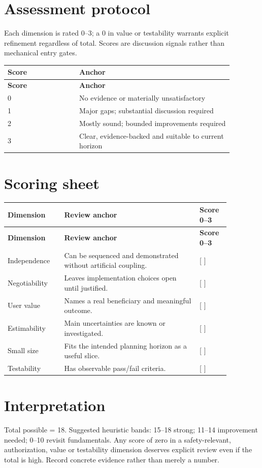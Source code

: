 \documentclass[11pt,letterpaper]{article}
\begin{document}
\section{Assessment protocol}
Each dimension is rated 0–3; a 0 in value or testability warrants explicit refinement regardless of total. Scores are discussion signals rather than mechanical entry gates.

\begin{longtable}{|p{0.28\linewidth}|p{0.60\linewidth}|}\hline
\textbf{Score} & \textbf{Anchor} \\ \hline\endfirsthead\hline
\textbf{Score} & \textbf{Anchor} \\ \hline\endhead
0 & No evidence or materially unsatisfactory \\ \hline
1 & Major gaps; substantial discussion required \\ \hline
2 & Mostly sound; bounded improvements required \\ \hline
3 & Clear, evidence-backed and suitable to current horizon \\ \hline
\end{longtable}
\section{Scoring sheet}
\begin{longtable}{|p{0.22\linewidth}|p{0.53\linewidth}|p{0.12\linewidth}|}\hline
\textbf{Dimension} & \textbf{Review anchor} & \textbf{Score 0--3} \\ \hline\endfirsthead
\textbf{Dimension} & \textbf{Review anchor} & \textbf{Score 0--3} \\ \hline\endhead
Independence & Can be sequenced and demonstrated without artificial coupling. & [  ] \\ \hline
Negotiability & Leaves implementation choices open until justified. & [  ] \\ \hline
User value & Names a real beneficiary and meaningful outcome. & [  ] \\ \hline
Estimability & Main uncertainties are known or investigated. & [  ] \\ \hline
Small size & Fits the intended planning horizon as a useful slice. & [  ] \\ \hline
Testability & Has observable pass/fail criteria. & [  ] \\ \hline
\end{longtable}
\section{Interpretation}
Total possible = 18. Suggested heuristic bands: 15–18 strong; 11–14 improvement needed; 0–10 revisit fundamentals. Any score of zero in a safety-relevant, authorization, value or testability dimension deserves explicit review even if the total is high. Record concrete evidence rather than merely a number.
\end{document}
